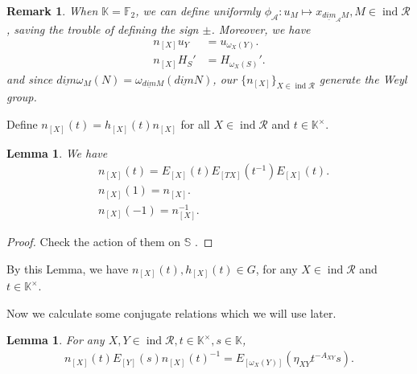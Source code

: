 \documentclass[12pt]{amsart}
\newtheorem{lemma}[theorem]{Lemma}
\newtheorem{remark}[theorem]{Remark}
\begin{document}
\begin{remark}
    When $\mathbb{K}=\mathbb{F}_2$, we can define uniformly $\phi_{\mathcal{A}}: u_M \mapsto x_{\underline{dim}_{\mathcal{A}}M}, M\in \operatorname{ind}\mathcal{R}$, saving the trouble of defining the sign $\pm$.
    Moreover, we have 
    \begin{align*}
        n_{[X]}u_Y &= u_{\omega_X(Y)}. \\
        n_{[X]}H_S' &= H_{\omega_X(S)}'.
    \end{align*}
    and since $ \underline{dim} \omega_M(N) =  \omega_{\underline{dim}M}(\underline{dim}N)  $, our $\{n_{[X]}\}_{X \in \operatorname{ind}\mathcal{R}}$ generate the Weyl group.
\end{remark}

Define $n_{[X]}(t) = h_{[X]}(t) n_{[X]}$ for all $X \in \operatorname{ind}\mathcal{R}$ and $t \in \mathbb{K}^{\times}$.
\begin{lemma}\label{nEEE}
    We have
    \begin{align*}
        &n_{[X]}(t) = E_{[X]}(t) E_{[TX]}(t^{-1}) E_{[X]}(t). \\
        &n_{[X]}(1) = n_{[X]} .\\
        &n_{[X]}(-1) = n_{[X]}^{-1}.
    \end{align*}
\end{lemma}

\begin{proof}
    Check the action of them on $\mathbb{S}$ .  
\end{proof}

By this Lemma, we have $n_{[X]}(t),h_{[X]}(t) \in G$, for any $ X\in \operatorname{ind}\mathcal{R}$ and $ t\in \mathbb{K}^{\times}$.

Now we calculate some conjugate relations which we will use later.

\begin{lemma}\label{nEn}
    For any $ X,Y \in \operatorname{ind}\mathcal{R},  t \in \mathbb{K}^{\times}, s \in \mathbb{K}$,
    \begin{align*}
        n_{[X]}(t) E_{[Y]}(s) n_{[X]}(t)^{-1} = E_{[\omega_X(Y)]}(\eta_{XY}t^{-A_{XY}}s).
    \end{align*}
\end{lemma}
\end{document}
